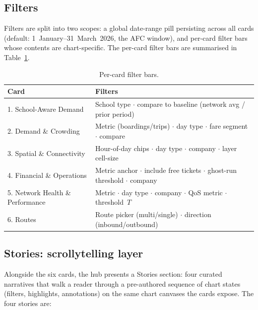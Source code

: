 \subsection{Filters}
\label{sec:proposed:filters}

Filters are split into two scopes: a global date-range pill
persisting across all cards (default: 1~January--31~March~2026,
the AFC window), and per-card filter bars whose contents are
chart-specific. The per-card filter bars are summarised in
Table~\ref{tab:proposed:filters_per_card}.

\begin{table}[H]
\centering
\caption{Per-card filter bars.}
\label{tab:proposed:filters_per_card}
\footnotesize
\renewcommand{\arraystretch}{1.20}
\begin{tabularx}{\linewidth}{p{3.4cm}X}
\hline
\textbf{Card} & \textbf{Filters} \\
\hline
1. School-Aware Demand & School type $\cdot$ compare to baseline (network avg / prior period) \\
2. Demand \& Crowding & Metric (boardings/trips) $\cdot$ day type $\cdot$ fare segment $\cdot$ compare \\
3. Spatial \& Connectivity & Hour-of-day chips $\cdot$ day type $\cdot$ company $\cdot$ layer cell-size \\
4. Financial \& Operations & Metric anchor $\cdot$ include free tickets $\cdot$ ghost-run threshold $\cdot$ company \\
5. Network Health \& Performance & Metric $\cdot$ day type $\cdot$ company $\cdot$ QoS metric $\cdot$ threshold~$T$ \\
6. Routes & Route picker (multi/single) $\cdot$ direction (inbound/outbound) \\
\hline
\end{tabularx}
\end{table}

\subsection{Stories: scrollytelling layer}
\label{sec:proposed:stories}

Alongside the six cards, the hub presents a Stories section:
four curated narratives that walk a reader through a pre-authored
sequence of chart states (filters, highlights, annotations) on
the same chart canvases the cards expose. The four stories are:

